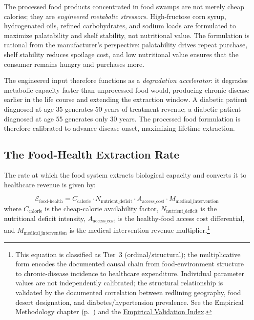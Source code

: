 The processed food products concentrated in food swamps are not merely cheap calories; they are \textit{engineered metabolic stressors}. High-fructose corn syrup, hydrogenated oils, refined carbohydrates, and sodium loads are formulated to maximize palatability and shelf stability, not nutritional value. The formulation is rational from the manufacturer's perspective: palatability drives repeat purchase, shelf stability reduces spoilage cost, and low nutritional value ensures that the consumer remains hungry and purchases more.

The engineered input therefore functions as a \textit{degradation accelerator}: it degrades metabolic capacity faster than unprocessed food would, producing chronic disease earlier in the life course and extending the extraction window. A diabetic patient diagnosed at age 35 generates 50 years of treatment revenue; a diabetic patient diagnosed at age 55 generates only 30 years. The processed food formulation is therefore calibrated to advance disease onset, maximizing lifetime extraction.

\subsection{The Food-Health Extraction Rate}

The rate at which the food system extracts biological capacity and converts it to healthcare revenue is given by:

\begin{equation}\label{eq:food-health}
\mathcal{E}_{\text{food-health}} = C_{\text{calorie}} \cdot N_{\text{nutrient\_deficit}} \cdot A_{\text{access\_cost}} \cdot M_{\text{medical\_intervention}}
\end{equation}
where $C_{\text{calorie}}$ is the cheap-calorie availability factor, $N_{\text{nutrient\_deficit}}$ is the nutritional deficit intensity, $A_{\text{access\_cost}}$ is the healthy-food access cost differential, and $M_{\text{medical\_intervention}}$ is the medical intervention revenue multiplier.\footnote{This equation is classified as Tier~3 (ordinal/structural); the multiplicative form encodes the documented causal chain from food-environment structure to chronic-disease incidence to healthcare expenditure. Individual parameter values are not independently calibrated; the structural relationship is validated by the documented correlation between redlining geography, food desert designation, and diabetes/hypertension prevalence. See the Empirical Methodology chapter (p.~\pageref{ch:empirical_methodology}) and the \hyperref[app:empirical_index]{Empirical Validation Index}.}

